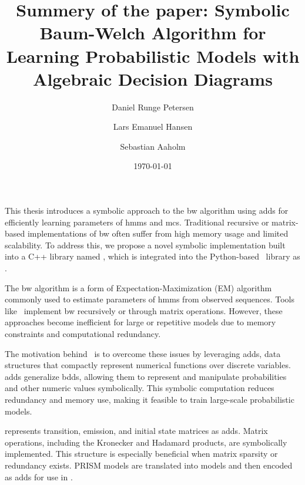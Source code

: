 \documentclass[a4paper]{article}
\title{Summery of the paper: Symbolic Baum-Welch Algorithm for Learning Probabilistic Models with Algebraic Decision Diagrams}
\date{\today}
\author{Daniel Runge Petersen \and Lars Emanuel Hansen \and Sebastian Aaholm}
\begin{document}
\maketitle
\thispagestyle{empty}
This thesis introduces a symbolic approach to the \gls{bw} algorithm using \glspl{add} for efficiently learning parameters of \glspl{hmm} and \glspl{mc}.
Traditional recursive or matrix-based implementations of \gls{bw} often suffer from high memory usage and limited scalability.
To address this, we propose a novel symbolic implementation built into a C++ library named \Cupaal, which is integrated into the Python-based \Jajapy\ library as \JajapyTwo.

The \gls{bw} algorithm is a form of Expectation-Maximization (EM) algorithm commonly used to estimate parameters of \glspl{hmm} from observed sequences.
Tools like \Jajapy\ implement \gls{bw} recursively or through matrix operations.
However, these approaches become inefficient for large or repetitive models due to memory constraints and computational redundancy.

The motivation behind \Cupaal\ is to overcome these issues by leveraging \glspl{add}, data structures that compactly represent numerical functions over discrete variables.
\glspl{add} generalize \glspl{bdd}, allowing them to represent and manipulate probabilities and other numeric values symbolically.
This symbolic computation reduces redundancy and memory use, making it feasible to train large-scale probabilistic models.

\Cupaal represents transition, emission, and initial state matrices as \glspl{add}.
Matrix operations, including the Kronecker and Hadamard products, are symbolically implemented.
This structure is especially beneficial when matrix sparsity or redundancy exists.
PRISM models are translated into \Jajapy models and then encoded as \glspl{add} for use in \Cupaal.
\end{document}
